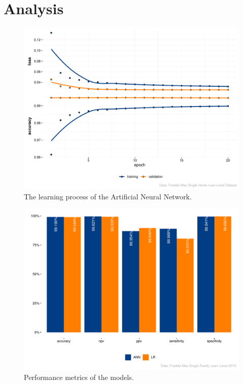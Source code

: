 \chapter{Analysis}\label{ch:5}

\begin{figure}[H]
    \centering
    \includegraphics[width = \textwidth]{Figures/p_ANN_learning.pdf}
    \caption{The learning process of the Artificial Neural Network.}
    \label{fig:p_learning_process_ANN}
\end{figure}






\begin{figure}[H]
    \centering
    \includegraphics[width = \textwidth]{Figures/p_performance.pdf}
    \caption{Performance metrics of the models.}
    \label{fig:p_performance}
\end{figure}

